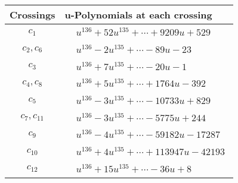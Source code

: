 \documentclass[1p]{elsarticle_modified}
\theoremstyle{definition}
\begin{document}
\begin{tabular}{m{50pt}|m{274pt}}
Crossings & \hspace{64pt}u-Polynomials at each crossing \\
\hline $$\begin{aligned}c_{1}\end{aligned}$$&$\begin{aligned}
&u^{136}+52 u^{135}+\cdots+9209 u+529
\end{aligned}$\\
\hline $$\begin{aligned}c_{2},c_{6}\end{aligned}$$&$\begin{aligned}
&u^{136}-2 u^{135}+\cdots-89 u-23
\end{aligned}$\\
\hline $$\begin{aligned}c_{3}\end{aligned}$$&$\begin{aligned}
&u^{136}+7 u^{135}+\cdots-20 u-1
\end{aligned}$\\
\hline $$\begin{aligned}c_{4},c_{8}\end{aligned}$$&$\begin{aligned}
&u^{136}+5 u^{135}+\cdots+1764 u-392
\end{aligned}$\\
\hline $$\begin{aligned}c_{5}\end{aligned}$$&$\begin{aligned}
&u^{136}-3 u^{135}+\cdots-10733 u+829
\end{aligned}$\\
\hline $$\begin{aligned}c_{7},c_{11}\end{aligned}$$&$\begin{aligned}
&u^{136}-3 u^{135}+\cdots-5775 u+244
\end{aligned}$\\
\hline $$\begin{aligned}c_{9}\end{aligned}$$&$\begin{aligned}
&u^{136}-4 u^{135}+\cdots-59182 u-17287
\end{aligned}$\\
\hline $$\begin{aligned}c_{10}\end{aligned}$$&$\begin{aligned}
&u^{136}+4 u^{135}+\cdots+113947 u-42193
\end{aligned}$\\
\hline $$\begin{aligned}c_{12}\end{aligned}$$&$\begin{aligned}
&u^{136}+15 u^{135}+\cdots-36 u+8
\end{aligned}$\\
\hline
\end{tabular}\\~\\
\end{document}
